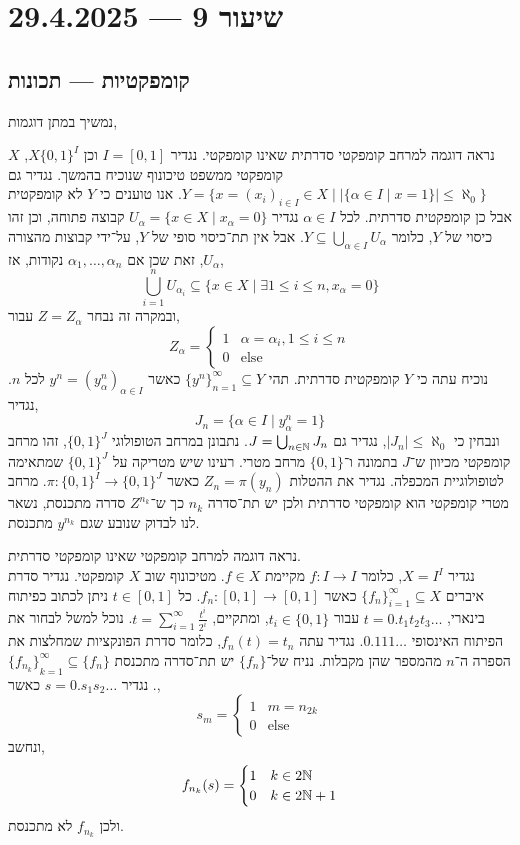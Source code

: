 \section{שיעור 9 --- 29.4.2025}
\subsection{קומפקטיות --- תכונות}
נמשיך במתן דוגמות,
\begin{example}
	נראה דוגמה למרחב קומפקטי סדרתית שאינו קומפקטי.
	נגדיר $I = [0, 1]$ וכן $X{\{0, 1\}}^I$, $X$ קומפקטי ממשפט טיכונוף שנוכיח בהמשך.
	נגדיר גם $Y = \{ x = {(x_i)}_{i \in I} \in X \mid |\{ \alpha \in I \mid x = 1\}| \le \aleph_0 \}$.
	אנו טוענים כי $Y$ לא קומפקטית אבל כן קומפקטית סדרתית.
	לכל $\alpha \in I$ נגדיר $U_{\alpha} = \{ x \in X \mid x_{\alpha} = 0 \}$ קבוצה פתוחה, וכן זהו כיסוי של $Y$, כלומר $Y \subseteq \bigcup_{\alpha \in I} U_{\alpha}$.
	אבל אין תת־כיסוי סופי של $Y$, על־ידי קבוצות מהצורה $U_{\alpha}$, זאת שכן אם $\alpha_1, \ldots, \alpha_n$ נקודות, אז,
	\[
		\bigcup_{i = 1}^n U_{\alpha_i}
		\subseteq \{ x \in X \mid \exists 1 \le i \le n, x_{\alpha} = 0 \}
	\]
	ובמקרה זה נבחר $Z = Z_{\alpha}$ עבור,
	\[
		Z_{\alpha} = \begin{cases}
			1 & \alpha = \alpha_i, 1 \le i \le n \\
			0 & \text{else}
		\end{cases}
	\]
	נוכיח עתה כי $Y$ קומפקטית סדרתית.
	תהי ${\{ y^n \}}_{n = 1}^\infty \subseteq Y$ כאשר $y^n = {( y_{\alpha}^n )}_{\alpha \in I}$ לכל $n$.
	נגדיר,
	\[
		J_n = \{ \alpha \in I \mid y_{\alpha}^n = 1 \}
	\]
	ונבחין כי $|J_n| \le \aleph_0$, נגדיר גם $J = \bigcup_{n \in \mathbb{N}} J_n$.
	נתבונן במרחב הטופולוגי ${\{0, 1\}}^J$, זהו מרחב קומפקטי מכיוון ש־$J$ בתמונה ו־$\{0, 1\}$ מרחב מטרי.
	רעינו שיש מטריקה על ${\{0, 1\}}^J$ שמתאימה לטופולוגיית המכפלה.
	נגדיר את ההטלות $Z_n = \pi(y_n)$ כאשר $\pi : {\{0, 1\}}^I \to {\{0, 1\}}^J$.
	מרחב מטרי קומפקטי הוא קומפקטי סדרתית ולכן יש תת־סדרה $n_k$ כך ש־$Z^{n_k}$ סדרה מתכנסת,
	נשאר לנו לבדוק שנובע שגם $y^{n_k}$ מתכנסת.
\end{example}
\begin{example}
	נראה דוגמה למרחב קומפקטי שאינו קומפקטי סדרתית. \\
	נגדיר $X = I^I$, כלומר $f : I \to I$ מקיימת $f \in X$.
	מטיכונוף שוב $X$ קומפקטי.
	נגדיר סדרת איברים ${\{ f_n \}}_{i = 1}^\infty \subseteq X$ כאשר $f_n : [0, 1] \to [0, 1]$.
	כל $t \in [0, 1]$ ניתן לכתוב כפיתוח בינארי, $t = 0. t_1 t_2 t_3 \ldots$ עבור $t_i \in \{0, 1\}$, ומתקיים, $t = \sum_{i = 1}^\infty \frac{t^i}{2^i}$.
	נוכל למשל לבחור את הפיתוח האינסופי $0.111\ldots$.
	נגדיר עתה $f_n(t) = t_n$, כלומר סדרת הפונקציות שמחלצות את הספרה ה־$n$ מהמספר שהן מקבלות.
	נניח של־$\{ f_n \}$ יש תת־סדרה מתכנסת $\{ {f_{n_k} \}}_{k = 1}^\infty \subseteq \{ f_n \}$.
	נגדיר $s = 0. s_1 s_2 \ldots$ כאשר,
	\[
		s_m
		= \begin{cases}
			1 & m = n_{2k} \\
			0 & \text{else}
		\end{cases}
	\]
	ונחשב,
	\[
		f_{n_k}(s)
		= \begin{cases}
			1 & k \in 2\mathbb{N} \\
			0 & k \in 2\mathbb{N} + 1
		\end{cases}
	\]
	ולכן $f_{n_k}$ לא מתכנסת.
\end{example}
